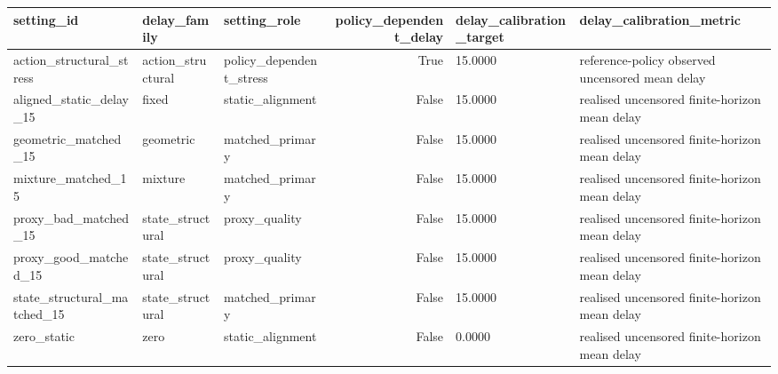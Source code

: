 \begin{tabular}{lllrll}
\toprule
setting\_id & delay\_family & setting\_role & policy\_dependent\_delay & delay\_calibration\_target & delay\_calibration\_metric \\
\midrule
action\_structural\_stress & action\_structural & policy\_dependent\_stress & True & 15.0000 & reference-policy observed uncensored mean delay \\
aligned\_static\_delay\_15 & fixed & static\_alignment & False & 15.0000 & realised uncensored finite-horizon mean delay \\
geometric\_matched\_15 & geometric & matched\_primary & False & 15.0000 & realised uncensored finite-horizon mean delay \\
mixture\_matched\_15 & mixture & matched\_primary & False & 15.0000 & realised uncensored finite-horizon mean delay \\
proxy\_bad\_matched\_15 & state\_structural & proxy\_quality & False & 15.0000 & realised uncensored finite-horizon mean delay \\
proxy\_good\_matched\_15 & state\_structural & proxy\_quality & False & 15.0000 & realised uncensored finite-horizon mean delay \\
state\_structural\_matched\_15 & state\_structural & matched\_primary & False & 15.0000 & realised uncensored finite-horizon mean delay \\
zero\_static & zero & static\_alignment & False & 0.0000 & realised uncensored finite-horizon mean delay \\
\bottomrule
\end{tabular}
